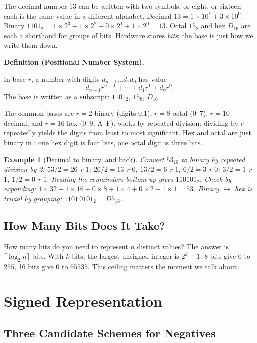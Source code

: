\documentclass[11pt]{article}
\newtheorem{example}{Example}[section]
\newenvironment{definitionbox}[1]{%
  \par\noindent\textbf{Definition (#1).}\ \itshape
}{\par\vspace{0.3em}}
\begin{document}
The decimal number $13$ can be written with two symbols, or eight, or sixteen --- each is the same value in a different alphabet. Decimal $13 = 1\times10^1 + 3\times10^0$. Binary $1101_2 = 1\times2^3+1\times2^2+0\times2^1+1\times2^0 = 13$. Octal $15_8$ and hex $D_{16}$ are each a shorthand for groups of bits. Hardware stores \emph{bits}; the base is just how we write them down.

\begin{definitionbox}{Positional Number System}
In base $r$, a number with digits $d_{n-1}\dots d_1 d_0$ has value
\[
  d_{n-1} r^{n-1} + \cdots + d_1 r^1 + d_0 r^0.
\]
The base is written as a subscript: $1101_2$, $15_8$, $D_{16}$.
\end{definitionbox}

The common bases are $r=2$ binary (digits 0,1), $r=8$ octal (0--7), $r=10$ decimal, and $r=16$ hex (0--9, A--F).  works by repeated division: dividing by $r$ repeatedly yields the digits from least to most significant. Hex and octal are just binary in : one hex digit is four bits, one octal digit is three bits.

\begin{example}[Decimal to binary, and back]
Convert $53_{10}$ to binary by repeated division by 2:
$53/2 = 26$ r $1$; $26/2 = 13$ r $0$; $13/2 = 6$ r $1$; $6/2 = 3$ r $0$; $3/2 = 1$ r $1$; $1/2 = 0$ r $1$. Reading the remainders bottom-up gives $110101_2$. Check by expanding: $1{\times}32 + 1{\times}16 + 0{\times}8 + 1{\times}4 + 0{\times}2 + 1{\times}1 = 53$. Binary $\leftrightarrow$ hex is trivial by grouping: $1101\,0101_2 = D5_{16}$.
\end{example}

\subsection{How Many Bits Does It Take?}

How many bits do you need to represent $n$ distinct values? The answer is $\lceil \log_2 n \rceil$ bits. With $k$ bits, the largest unsigned integer is $2^k - 1$: 8 bits give $0$ to $255$, 16 bits give $0$ to $65535$. This ceiling matters the moment we talk about .

\section{Signed Representation}
\label{sec:signed}

\subsection{Three Candidate Schemes for Negatives}
\end{document}
